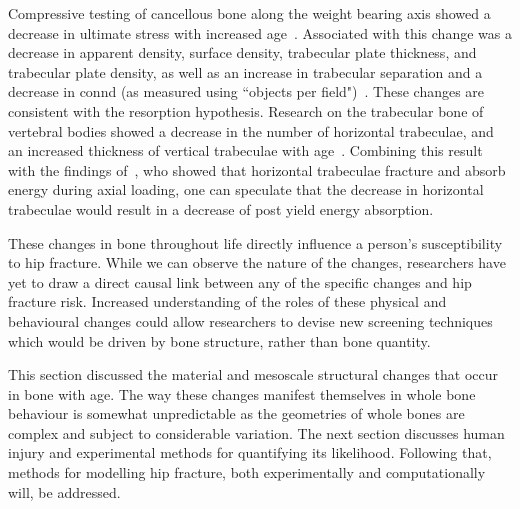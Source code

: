 Compressive testing of cancellous bone along the weight bearing axis showed a decrease in ultimate stress with increased age~\citep{mccalden_age-related_1997}.
Associated with this change was a decrease in apparent density, surface density, trabecular plate thickness, and trabecular plate density, as well as an increase in trabecular separation and a decrease in \ac{connd} (as measured using ``objects per field")~\citep{mccalden_age-related_1997}.
These changes are consistent with the resorption hypothesis.
Research on the trabecular bone of vertebral bodies showed a decrease in the number of horizontal trabeculae, and an increased thickness of vertical trabeculae with age~\citep{mosekilde_age-related_1988}.
Combining this result with the findings of~\citet{fyhrie_failure_1994}, who showed that horizontal trabeculae fracture and absorb energy during axial loading, one can speculate that the decrease in horizontal trabeculae would result in a decrease of post yield energy absorption.

These changes in bone throughout life directly influence a person's susceptibility to hip fracture.
While we can observe the nature of the changes, researchers have yet to draw a direct causal link between any of the specific changes and hip fracture risk.
Increased understanding of the roles of these physical and behavioural changes could allow researchers to devise new screening techniques which would be driven by bone structure, rather than bone quantity.

This section discussed the material and mesoscale structural changes that occur in bone with age.
The way these changes manifest themselves in whole bone behaviour is somewhat unpredictable as the geometries of whole bones are complex and subject to considerable variation.
The next section discusses human injury and experimental methods for quantifying its likelihood.
Following that, methods for modelling hip fracture, both experimentally and computationally will, be addressed.

